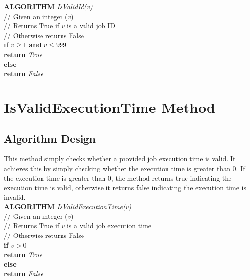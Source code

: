 \documentclass[12pt,a4paper]{article}
\begin{document}
			\textbf{ALGORITHM} \textit{IsValidId(v)}\\
			\null\hspace{1cm}// Given an integer (\textit{v})\\
			\null\hspace{1cm}// Returns True if \textit{v} is a valid job ID\\
			\null\hspace{1cm}// Otherwise returns False\\
			\null\hspace{1cm}\textbf{if} \textit{$v \geq 1$} \textbf{and} \textit{$v \leq 999$}\\
			\null\hspace{2cm}\textbf{return} \textit{True}\\
			\null\hspace{1cm}\textbf{else}\\
			\null\hspace{2cm}\textbf{return} \textit{False}\\

	\section{IsValidExecutionTime Method}
		\subsection{Algorithm Design}
			This method simply checks whether a provided job execution time is valid. It achieves 
			this by simply checking whether the execution time is greater than 0. If the execution 
			time is greater than 0, the method returns true indicating the execution time is valid,
			otherwise it returns false indicating the execution time is invalid.\\

			\textbf{ALGORITHM} \textit{IsValidExecutionTime(v)}\\
			\null\hspace{1cm}// Given an integer (\textit{v})\\
			\null\hspace{1cm}// Returns True if \textit{v} is a valid job execution time\\
			\null\hspace{1cm}// Otherwise returns False\\
			\null\hspace{1cm}\textbf{if} \textit{$v > 0$}\\
			\null\hspace{2cm}\textbf{return} \textit{True}\\
			\null\hspace{1cm}\textbf{else}\\
			\null\hspace{2cm}\textbf{return} \textit{False}
\end{document}
